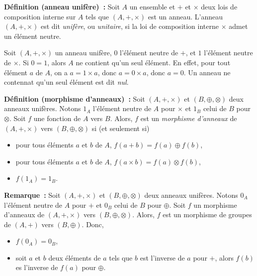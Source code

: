 \medskip

\noindent\textbf{Définition (anneau unifère) :} Soit $A$ un ensemble et $+$ et $\times$ deux lois de composition interne sur $A$ tels que $(A, +, \times)$ est un anneau. 
    L'anneau $(A, +, \times)$ est dit \textit{unifère}, ou \textit{unitaire}, si la loi de composition interne $\times$ admet un élément neutre.

\medskip

Soit $(A, +, \times)$ un anneau unifère, $0$ l'élément neutre de $+$, et $1$ l'élément neutre de $\times$. 
Si $0 = 1$, alors $A$ ne contient qu'un seul élément. 
En effet, pour tout élément $a$ de $A$, on a $a = 1 \times a$, donc $a = 0 \times a$, donc $a = 0$. 
Un anneau ne contennat qu'un seul élément est dit \textit{nul}. 

\medskip

\noindent\textbf{Définition (morphisme d'anneaux) :} Soit $(A, +, \times)$ et $(B, \oplus, \otimes)$ deux anneaux unifères.
    Notons $1_A$ l'élément neutre de $A$ pour $\times$ et $1_B$ celui de $B$ pour $\otimes$.
    Soit $f$ une fonction de $A$ vers $B$. 
    Alors, $f$ est un \emph{morphisme d'anneaux} de $(A, +, \times)$ vers $(B, \oplus, \otimes)$ si (et seulement si)
    \begin{itemize}[nosep]
        \item pour tous éléments $a$ et $b$ de $A$, $f(a + b) = f(a) \oplus f(b)$,
        \item pour tous éléments $a$ et $b$ de $A$, $f(a \times b) = f(a) \otimes f(b)$,
        \item $f(1_A) = 1_B$.
    \end{itemize}

\medskip

\noindent\textbf{Remarque :} Soit $(A, +, \times)$ et $(B, \oplus, \otimes)$ deux anneaux unifères.
    Notons $0_A$ l'élément neutre de $A$ pour $+$ et $0_B$ celui de $B$ pour $\oplus$.
    Soit $f$ un morphisme d'anneaux de $(A, +, \times)$ vers $(B, \oplus, \otimes)$.
    Alors, $f$ est un morphisme de groupes de $(A, +)$ vers $(B, \oplus)$.
    Donc, 
    \begin{itemize}[nosep]
        \item $f(0_A) = 0_B$, 
        \item soit $a$ et $b$ deux éléments de $a$ tels que $b$ est l'inverse de $a$ pour $+$, alors $f(b)$ es l'inverse de $f(a)$ pour $\oplus$.
    \end{itemize}

\medskip

